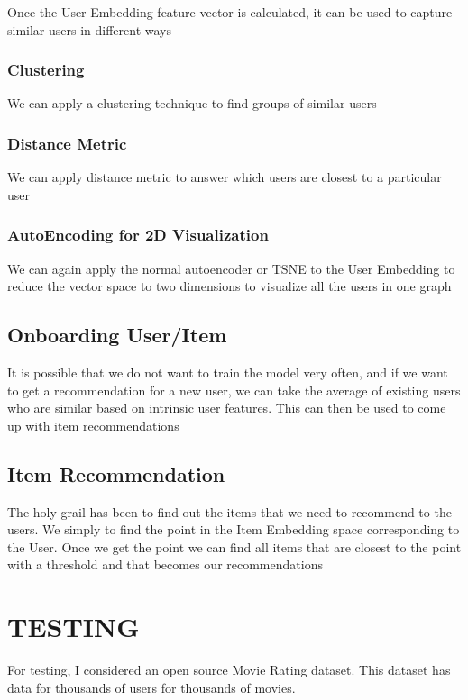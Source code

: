 \documentclass[letterpaper,twocolumn,10pt]{article}
\begin{document}
Once the User Embedding feature vector is calculated, it can be used to capture similar users in different ways
\subsubsection { Clustering }
We can apply a clustering technique to find groups of similar users

\subsubsection { Distance Metric }
We can apply distance metric to answer which users are closest to a particular user

\subsubsection { AutoEncoding for 2D Visualization }
We can again apply the normal autoencoder or TSNE to the User Embedding to reduce the vector space to two dimensions to visualize all the users in one graph


\subsection{Onboarding User/Item}
It is possible that we do not want to train the model very often, and if we want to get a recommendation for a new user, we can take the average of existing users who are similar based on intrinsic user features. This can then be used to come up with item recommendations

\subsection{Item Recommendation}
The holy grail has been to find out the items that we need to recommend to the users. We simply to find the point in the Item Embedding space corresponding to the User. Once we get the point we can find all items that are closest to the point with a threshold and that becomes our recommendations


\section {TESTING}

For testing, I considered an open source Movie Rating dataset. This dataset has data for thousands of users for thousands of movies. 

{\footnotesize 
}
\end{document}
